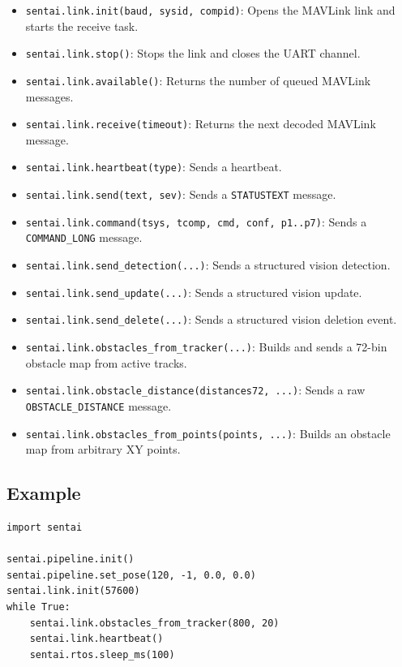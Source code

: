 \begin{itemize}
\tightlist
\item
  \texttt{sentai.link.init(baud,\ sysid,\ compid)}: Opens the MAVLink
  link and starts the receive task.
\item
  \texttt{sentai.link.stop()}: Stops the link and closes the UART
  channel.
\item
  \texttt{sentai.link.available()}: Returns the number of queued MAVLink
  messages.
\item
  \texttt{sentai.link.receive(timeout)}: Returns the next decoded
  MAVLink message.
\item
  \texttt{sentai.link.heartbeat(type)}: Sends a heartbeat.
\item
  \texttt{sentai.link.send(text,\ sev)}: Sends a \texttt{STATUSTEXT}
  message.
\item
  \texttt{sentai.link.command(tsys,\ tcomp,\ cmd,\ conf,\ p1..p7)}:
  Sends a \texttt{COMMAND\_LONG} message.
\item
  \texttt{sentai.link.send\_detection(...)}: Sends a structured vision
  detection.
\item
  \texttt{sentai.link.send\_update(...)}: Sends a structured vision
  update.
\item
  \texttt{sentai.link.send\_delete(...)}: Sends a structured vision
  deletion event.
\item
  \texttt{sentai.link.obstacles\_from\_tracker(...)}: Builds and sends a
  72-bin obstacle map from active tracks.
\item
  \texttt{sentai.link.obstacle\_distance(distances72,\ ...)}: Sends a
  raw \texttt{OBSTACLE\_DISTANCE} message.
\item
  \texttt{sentai.link.obstacles\_from\_points(points,\ ...)}: Builds an
  obstacle map from arbitrary XY points.
\end{itemize}

\subsection{Example}\label{example-12}

\begin{verbatim}
import sentai

sentai.pipeline.init()
sentai.pipeline.set_pose(120, -1, 0.0, 0.0)
sentai.link.init(57600)
while True:
    sentai.link.obstacles_from_tracker(800, 20)
    sentai.link.heartbeat()
    sentai.rtos.sleep_ms(100)
\end{verbatim}

